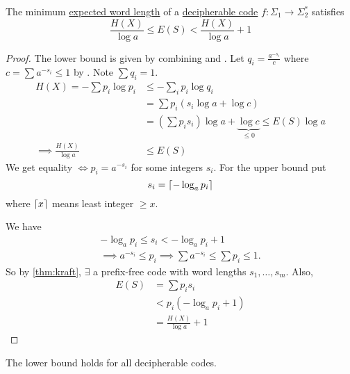 \documentclass{article}
\DeclarePairedDelimiter{\ceil}{\lceil}{\rceil}
\begin{document}
\begin{nthm}
    The minimum \hyperlink{def:ewl}{expected word length} of a \hyperlink{def:decipherable}{decipherable code} $f: \Sigma_1 \to \Sigma_2^*$ satisfies
    \begin{equation*}
        \frac{H(X)}{\log a} \leq E(S) < \frac{H(X)}{\log a} + 1
    \end{equation*}
\end{nthm}
\begin{proof}
    The lower bound is given by combining  and .
    Let $q_i = \frac{a^{-s_i}}{c}$ where $c = \sum a^{-s_i} \leq 1$ by .
    Note $\sum q_i = 1$.
    \begin{align*}
        H(X) = -\sum p_i \log p_i &\leq -\sum_i p_i \log q_i \\
                                  &= \sum p_i (s_i \log a + \log c) \\
                                  &= \left(\sum p_i s_i\right) \log a + \underbrace{\log c}_{\leq 0} \leq E(S) \log a\\
        \implies \frac{H(X)}{\log a} &\leq E(S)
    \end{align*}
    We get equality $\iff p_i = a^{-s_i}$ for some integers $s_i$.
    For the upper bound put
    \begin{equation*}
        s_i = \ceil{-\log_a p_i}
    \end{equation*}
    where $\ceil{x}$ means least integer $\geq x$.

    We have
    \begin{gather*}
        - \log_a p_i \leq s_i < - \log_a p_i + 1 \\
        \implies a^{-s_i} \leq p_i \implies \sum a^{-s_i} \leq \sum p_i \leq 1.
    \end{gather*}
    So by \cref{thm:kraft}, $\exists$ a prefix-free code with word lengths $s_1, \dotsc, s_m$.
    Also,
    \begin{align*}
        E(S) &= \sum p_i s_i \\
             &< p_i (- \log_a p_i + 1) \\
             &= \frac{H(X)}{\log a} + 1
    \end{align*}
\end{proof}
\begin{remark}
    The lower bound holds for all decipherable codes.
\end{remark}
\end{document}

